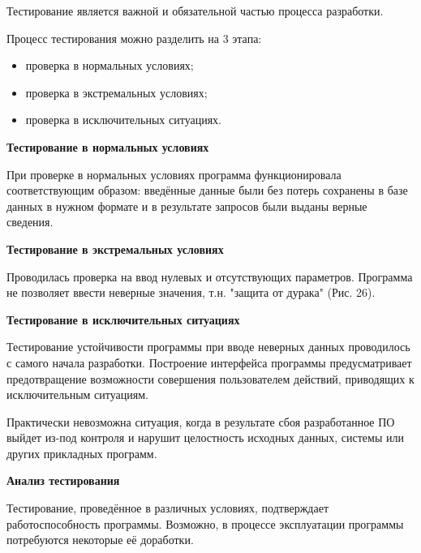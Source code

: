Тестирование является важной и обязательной частью процесса разработки.

Процесс тестирования можно разделить на 3 этапа:
\begin{itemize}
  \item проверка в нормальных условиях;
  \item проверка в экстремальных условиях;
  \item проверка в исключительных ситуациях.
\end{itemize}

\textbf{Тестирование в нормальных условиях}

При проверке в нормальных условиях программа функционировала соответствующим образом:
введённые данные были без потерь сохранены в базе данных в нужном формате и в результате запросов были выданы верные сведения.

\textbf{Тестирование в экстремальных условиях}

Проводилась проверка на ввод нулевых и отсутствующих параметров. Программа не позволяет ввести неверные значения, т.н.
"защита от дурака" (Рис. 26).


\textbf{Тестирование в исключительных ситуациях}

Тестирование устойчивости программы при вводе неверных данных проводилось с самого начала разработки.
Построение интерфейса программы предусматривает предотвращение возможности совершения пользователем действий,
приводящих к исключительным ситуациям.

Практически невозможна ситуация, когда в результате сбоя разработанное ПО выйдет из-под контроля и
нарушит целостность исходных данных, системы или других прикладных программ.

\textbf{Анализ тестирования}

Тестирование, проведённое в различных условиях, подтверждает работоспособность программы. Возможно, в процессе эксплуатации программы потребуются некоторые её доработки.
